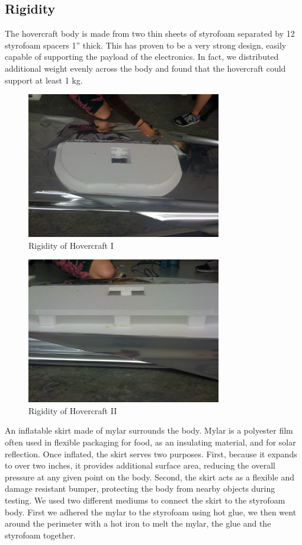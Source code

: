 \subsection{Rigidity}
The hovercraft body is made from two thin sheets of styrofoam separated by 12 styrofoam spacers 1'' thick. This has proven to be a very strong design, easily capable of supporting the payload of the electronics. In fact, we distributed additional weight evenly across the body and found that the hovercraft could support at least 1 kg.

\begin{figure}[h]
  \begin{center}
    \includegraphics[width=85mm]{imageSources/rigidity1.png}
  \end{center}
  \caption{Rigidity of Hovercraft I} 
  \label{rigidity1}
\end{figure}

\begin{figure}[h]
  \begin{center}
    \includegraphics[width=85mm]{imageSources/rigidity2.png}
  \end{center}
  \caption{Rigidity of Hovercraft II} 
  \label{rigidity2}
\end{figure}

An inflatable skirt made of mylar surrounds the body. Mylar is a polyester film often used in flexible packaging for food, as an insulating material, and for solar reflection. Once inflated, the skirt serves two purposes. First, because it expands to over two inches, it provides additional surface area, reducing the overall pressure at any given point on the body. Second, the skirt acts as a flexible and damage resistant bumper, protecting the body from nearby objects during testing. We used two different mediums to connect the skirt to the styrofoam body. First we adhered the mylar to the styrofoam using hot glue, we then went around the perimeter with a hot iron to melt the mylar, the glue and the styrofoam together.

